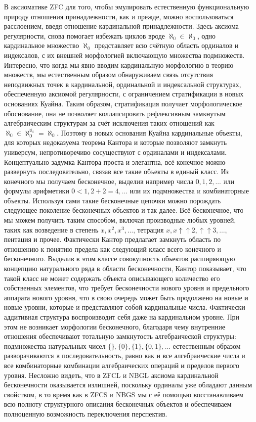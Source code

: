 \documentclass[12pt]{article}
\begin{document}
В аксиоматике ZFC для того, чтобы эмулировать естественную функциональную природу отношения принадлежности, как и прежде, можно воспользоваться расслоением, введя отношение кардинальной принадлежности. Здесь аксиома регулярности, снова помогает избежать циклов вроде $\aleph_0 \in \aleph_0$, одно кардинальное множество $\aleph_0$ представляет всю счётную область ординалов и индексалов, с их внешней морфологией включающую множества подмножеств. Интересно, что когда мы явно вводим кардинальную морфологию в теорию множеств, мы естественным образом обнаруживаем связь отсутствия неподвижных точек в кардинальной, ординальной и индексальной структурах, обеспеченную аксиомой регулярности, с ограничением стратификации в новых основаниях Куайна. Таким образом, стратификация получает морфологическое обоснование, она не позволяет коллапсировать рефлексивным замкнутым алгебраическим структурам за счёт исключения таких отношений как $\aleph_0 \in \aleph_0^{\aleph_0} = \aleph_0$. Поэтому в новых основания Куайна кардинальные объекты, для которых недоказуема теорема Кантора и которые позволяют замкнуть универсум, непротиворечиво сосуществуют с ординалами и индексалами. Концептуально задумка Кантора проста и элегантна, всё конечное можно развернуть последовательно, связав все такие объекты в единый класс. Из конечного мы получаем бесконечное, выделив например числа $0, 1, 2, \dots$ или формулы арифметики $0 < 1, 2 + 2 = 4, \dots$ или их подмножества и комбинаторные объекты. Используя сами такие бесконечные цепочки можно порождать следующее поколение бесконечных объектов и так далее. Всё бесконечное, что мы можем получить таким способом, включая производные любых уровней, таких как возведение в степень $x, x^2, x^3, \dots$, тетрация $x, x \uparrow \uparrow 2,  \uparrow \uparrow 3, \dots$, пентация и прочее. Фактически Кантор предлагает замкнуть область по отношению к понятию предела как следующий класс всего конечного и бесконечного. Выделив в этом классе совокупность объектов расширяющую концепцию натурального ряда в области бесконечности, Кантор показывает, что такой класс не может содержать объекта описывающего количество его собственных элементов, что требует бесконечности нового уровня и предельного аппарата нового уровня, что в свою очередь может быть продолжено на новые и новые уровни, которые и представляют собой кардинальные числа. Фактически аддитивная структура воспроизводит себя даже на кардинальном уровне. При этом не возникает морфологии бесконечного, благодаря чему внутренние отношения обеспечивают тотальную замкнутость алгебраической структуры: подмножества натуральных чисел $\{\}, \{0\}, \{1\}, \{0, 1\}, \dots$ естественным образом разворачиваются в последовательность, равно как и все алгебраические числа и все комбинаторные комбинации алгебраических операций и пределов первого уровня. Несложно видеть, что в ZFCL и NBGL аксиома кардинальной бесконечности оказывается излишней, поскольку ординалы уже обладают данным свойством, в то время как в ZFCS и NBGS мы с её помощью восстанавливаем всю полноту структурного описания бесконечных объектов и обеспечиваем полноценную возможность переключения перспектив. 
\end{document}
